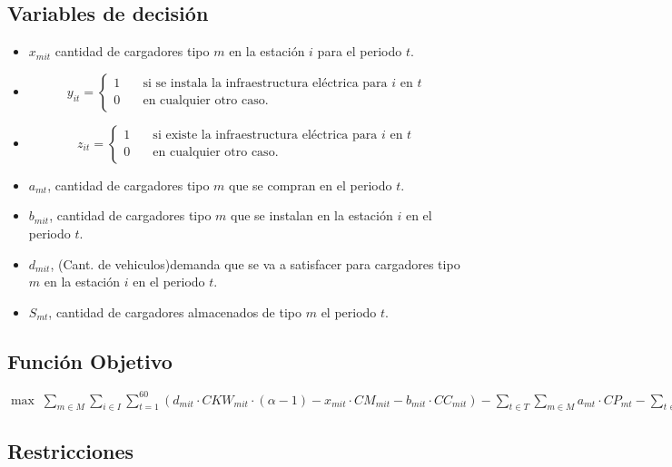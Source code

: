 \documentclass[letterpaper]{article}
\begin{document}
\begin{flushleft}
	\subsection{Variables de decisión}
	\begin{itemize}
		\item $x_{mit}$ cantidad de cargadores tipo $m$ en la estación $i$ para el periodo $t$.
		\item \[
			      y_{it} =
			      \begin{cases}
				      1 & \quad\text{si se instala la infraestructura eléctrica para }i\text{ en }t \\
				      0 & \quad\text{en cualquier otro caso.}
			      \end{cases}
		      \]
		\item \[
			      z_{it} =
			      \begin{cases}
				      1 & \quad\text{si existe la infraestructura eléctrica para }i\text{ en }t \\
				      0 & \quad\text{en cualquier otro caso.}
			      \end{cases}
		      \]
		\item $a_{mt}$, cantidad de cargadores tipo $m$ que se compran en el periodo $t$.
		\item $b_{mit}$, cantidad de cargadores tipo $m$ que se instalan en la estación $i$ en el periodo $t$.
		\item $d_{mit}$, (Cant. de vehiculos)demanda que se va a satisfacer para cargadores tipo $m$ en la estación $i$ en el periodo $t$.
		\item $S_{mt}$, cantidad de cargadores almacenados de tipo $m$ el periodo $t$.
	\end{itemize}
	\subsection{Función Objetivo}
	\begin{center}
		$\max \; \sum_{m \in M}\sum_{i \in I} \sum_{t=1}^{60} (d_{mit} \cdot CKW_{mit} \cdot (\alpha - 1) - x_{mit} \cdot CM_{mit} - b_{mit} \cdot CC_{mit}) - \sum_{t \in T} \sum_{m \in M} a_{mt} \cdot CP_{mt} - \sum_{t \in T}\sum_{m \in M} CS_{mt} \cdot S_{mt} - \sum_{t \in T} \sum_{i \in I} y_{it} \cdot CI_{it}$
	\end{center}

	\subsection{Restricciones}


\end{flushleft}
\end{document}
